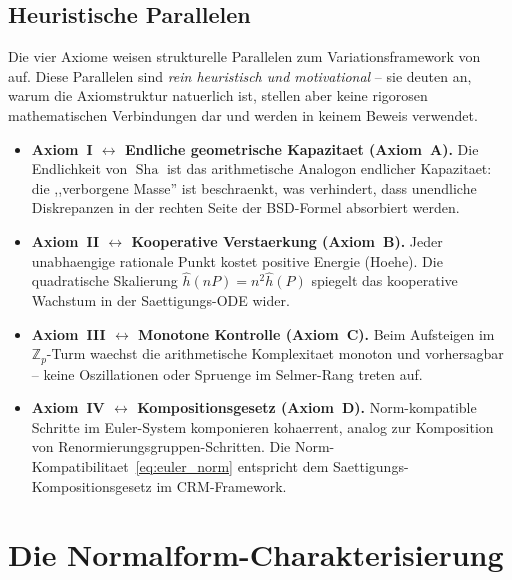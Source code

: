 \documentclass[aps,prd,twocolumn,superscriptaddress,nofootinbib]{revtex4-2}
\theoremstyle{definition}
\theoremstyle{remark}
\DeclareMathOperator{\Sha}{Sha}
\begin{document}
\subsection{Heuristische Parallelen}
\label{sec:heuristic}

Die vier Axiome weisen strukturelle Parallelen zum Variationsframework von~\cite{FST-Unified2026} auf. Diese Parallelen sind \textit{rein heuristisch und motivational} -- sie deuten an, warum die Axiomstruktur natuerlich ist, stellen aber keine rigorosen mathematischen Verbindungen dar und werden in keinem Beweis verwendet.

\begin{itemize}
\item \textbf{Axiom~I $\leftrightarrow$ Endliche geometrische Kapazitaet (Axiom~A).} Die Endlichkeit von $\Sha$ ist das arithmetische Analogon endlicher Kapazitaet: die ,,verborgene Masse'' ist beschraenkt, was verhindert, dass unendliche Diskrepanzen in der rechten Seite der BSD-Formel absorbiert werden.

\item \textbf{Axiom~II $\leftrightarrow$ Kooperative Verstaerkung (Axiom~B).} Jeder unabhaengige rationale Punkt kostet positive Energie (Hoehe). Die quadratische Skalierung $\hat{h}(nP) = n^2 \hat{h}(P)$ spiegelt das kooperative Wachstum in der Saettigungs-ODE wider.

\item \textbf{Axiom~III $\leftrightarrow$ Monotone Kontrolle (Axiom~C).} Beim Aufsteigen im $\mathbb{Z}_p$-Turm waechst die arithmetische Komplexitaet monoton und vorhersagbar -- keine Oszillationen oder Spruenge im Selmer-Rang treten auf.

\item \textbf{Axiom~IV $\leftrightarrow$ Kompositionsgesetz (Axiom~D).} Norm-kompatible Schritte im Euler-System komponieren kohaerrent, analog zur Komposition von Renormierungsgruppen-Schritten. Die Norm-Kompatibilitaet~\eqref{eq:euler_norm} entspricht dem Saettigungs-Kompositionsgesetz im CRM-Framework.
\end{itemize}


\section{Die Normalform-Charakterisierung}
\label{sec:normal_form}
\end{document}
